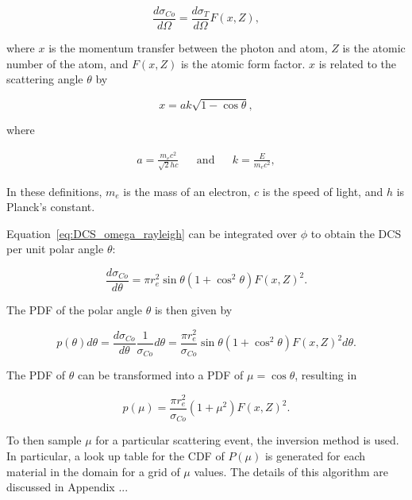 \begin{equation}
    \frac{d\sigma_{Co}}{d\Omega} = \frac{d\sigma_T}{d\Omega} F(x, Z),
    \label{eq:DCS_omega_rayleigh}
\end{equation}

where $x$ is the momentum transfer between the photon and atom, $Z$ is the atomic number of the atom, and $F(x, Z)$ is the atomic form factor. $x$ is related to the scattering angle $\theta$ by

\begin{equation}
    x = ak\sqrt{1 - \cos\theta},
\end{equation}

where

\begin{align}
    a = \frac{m_e c^2}{\sqrt{2}hc} && \textrm{and} && k = \frac{E}{m_e c^2},
\end{align}

\par In these definitions, $m_e$ is the mass of an electron, $c$ is the speed of light, and $h$ is Planck's constant.

\par Equation~\ref{eq:DCS_omega_rayleigh} can be integrated over $\phi$ to obtain the DCS per unit polar angle $\theta$:

\begin{equation}
    \frac{d\sigma_{Co}}{d\theta} = \pi r_e^2 \sin \theta (1 + \cos^2 \theta) F(x, Z)^2.
\end{equation}

\par The PDF of the polar angle $\theta$ is then given by

\begin{equation}
    p(\theta) d\theta = \frac{d\sigma_{Co}}{d\theta} \frac{1}{\sigma_{Co}} d\theta = \frac{\pi r_e^2}{\sigma_{Co}} \sin \theta (1 + \cos^2 \theta) F(x, Z)^2 d \theta.
\end{equation}

\par The PDF of $\theta$ can be transformed into a PDF of $\mu = \cos \theta$, resulting in

\begin{equation}
    p(\mu) = \frac{\pi r_e^2}{\sigma_{Co}} (1 + \mu^2) F(x, Z)^2.
\end{equation}

\par To then sample $\mu$ for a particular scattering event, the inversion method is used. In particular, a look up table for the CDF of $P(\mu)$ is generated for each material in the domain for a grid of $\mu$ values. The details of this algorithm are discussed in Appendix ... \\

